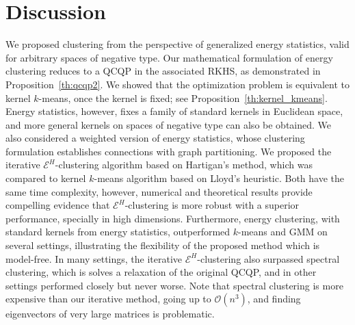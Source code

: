 \documentclass[aps,preprint,nofootinbib,floatfix]{revtex4-1}
\begin{document}
\section{Discussion}
\label{sec:conclusion}

We proposed clustering from the perspective of generalized energy
statistics, valid for arbitrary spaces of negative type.
Our mathematical formulation of energy clustering 
reduces to a QCQP in the associated RKHS, as demonstrated in 
Proposition~\ref{th:qcqp2}.
We showed that the optimization problem
is equivalent
to kernel $k$-means, once the kernel is fixed; see
Proposition~\ref{th:kernel_kmeans}. Energy statistics, however, fixes
a family of standard kernels in Euclidean space, and
more general kernels 
on spaces of negative type can also be obtained.
We also considered a weighted version of energy statistics, whose 
clustering formulation establishes connections with 
graph partitioning.
We proposed the iterative $\mathcal{E}^H$-clustering algorithm based on 
Hartigan's method, which was compared to kernel $k$-means algorithm
based on Lloyd's heuristic.
Both have the same time complexity, however, numerical and theoretical
results provide compelling evidence that $\mathcal{E}^H$-clustering
is more robust with a superior performance, specially in high
dimensions. 
Furthermore, energy clustering, with standard kernels from energy
statistics, outperformed $k$-means and GMM
on several settings, illustrating the flexibility
of the proposed method which is model-free. In many
settings, the iterative
$\mathcal{E}^H$-clustering also surpassed spectral clustering, which
is solves a relaxation of the original QCQP, and in other settings performed
closely but never worse. Note that spectral clustering is more expensive
than our iterative method, going up to $\mathcal{O}(n^3)$, and finding
eigenvectors of very large matrices is problematic.
\end{document}
